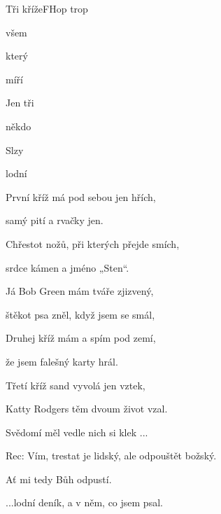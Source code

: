 \setcounter{page}{93}
\begin{song}{Tři kříže}{F}{Hop trop}

\begin{SBVerse}

všem 

který 


míří 

\end{SBVerse}

\begin{SBChorus}

Jen tři 

někdo 

Slzy 

lodní 

\end{SBChorus}

\begin{SBVerse}

První kříž má pod sebou jen hřích, 

samý pití a rvačky jen.

Chřestot nožů, při kterých přejde smích, 

srdce kámen a jméno „Sten“.

\end{SBVerse}

\begin{SBVerse}

Já Bob Green mám tváře zjizvený, 

štěkot psa zněl, když jsem se smál,

Druhej kříž mám a spím pod zemí, 

že jsem falešný karty hrál.

\end{SBVerse}

\begin{SBVerse}

Třetí kříž sand vyvolá jen vztek, 

Katty Rodgers těm dvoum život vzal.

Svědomí měl vedle nich si klek ...

\end{SBVerse}
\begin{SBChorus*}
Rec: Vím, trestat je lidský, ale odpouštět božský. 

Ať mi tedy Bůh odpustí.
\end{SBChorus*}
\begin{SBChorus}

...lodní deník, a v něm, co jsem psal.

\end{SBChorus}
\end{song}

\pagebreak
